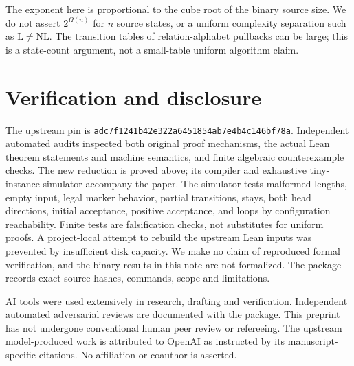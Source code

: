 \documentclass[11pt]{article}
\begin{document}
The exponent here is proportional to the cube root of the binary source
size. We do not assert $2^{\Omega(n)}$ for $n$ source states, or a uniform
complexity separation such as $\mathrm L\ne\mathrm{NL}$. The transition
tables of relation-alphabet pullbacks can be large; this is a state-count
argument, not a small-table uniform algorithm claim.

\section{Verification and disclosure}
The upstream pin is \texttt{adc7f1241b42e322a6451854ab7e4b4c146bf78a}.
Independent automated audits inspected both original proof mechanisms,
the actual Lean theorem statements and machine semantics, and finite
algebraic counterexample checks. The new reduction is proved above;
its compiler and exhaustive tiny-instance simulator accompany the paper.
The simulator tests malformed lengths, empty input, legal marker behavior,
partial transitions, stays, both head directions, initial acceptance,
positive acceptance, and loops by configuration reachability. Finite tests
are falsification checks, not substitutes for uniform proofs.
A project-local attempt to rebuild the upstream Lean inputs was prevented
by insufficient disk capacity. We make no claim of reproduced formal
verification, and the binary results in this note are not formalized.
The package records exact source hashes, commands, scope and limitations.

AI tools were used extensively in research, drafting and verification.
Independent automated adversarial reviews are documented with the package.
This preprint has not undergone conventional human peer review or refereeing.
The upstream model-produced work is attributed to OpenAI as instructed by
its manuscript-specific citations. No affiliation or coauthor is asserted.
\end{document}

